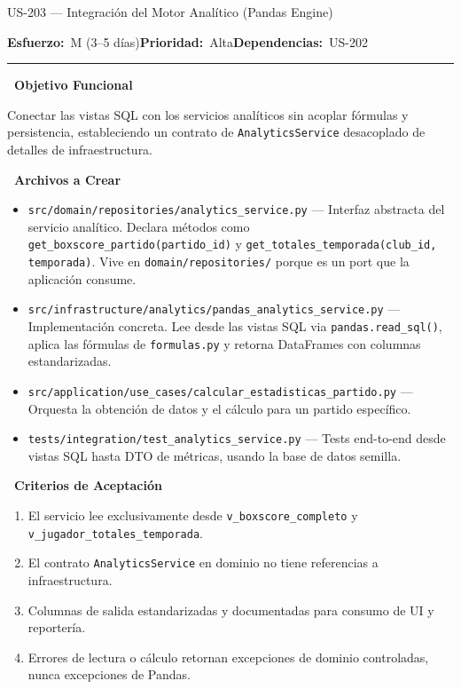 \documentclass[11pt,a4paper]{article}
\newcommand{\fpath}[1]{\texttt{\small #1}}
\newcommand{\usfield}[2][\;]{%
  \par\vspace{5pt}%
  {\small\textbf{\textcolor{primary}{#2}}}\par\vspace{2pt}%
}
\newcommand{\usmeta}[3]{%
  \vspace{2pt}%
  {\small\textcolor{secondary}{%
    \textbf{Esfuerzo:}~#1\quad\textbf{Prioridad:}~#2\quad\textbf{Dependencias:}~#3%
  }}%
  \par\vspace{4pt}%
  \textcolor{bordergray}{\rule{\linewidth}{0.4pt}}\par\vspace{4pt}%
}
\begin{document}
\begin{uscard}{US-203 — Integración del Motor Analítico (Pandas Engine)}

\usmeta{M (3–5 días)}{Alta}{US-202}

\usfield{\faAlignLeft\ Objetivo Funcional}
Conectar las vistas SQL con los servicios analíticos sin acoplar fórmulas y persistencia, estableciendo un contrato de \fpath{AnalyticsService} desacoplado de detalles de infraestructura.

\usfield{\faFolderOpen\ Archivos a Crear}
\begin{itemize}[nosep, leftmargin=1.6em]
  \item \fpath{src/domain/repositories/analytics\_service.py} — Interfaz abstracta del servicio analítico. Declara métodos como \fpath{get\_boxscore\_partido(partido\_id)} y \fpath{get\_totales\_temporada(club\_id, temporada)}. Vive en \fpath{domain/repositories/} porque es un port que la aplicación consume.
  \item \fpath{src/infrastructure/analytics/pandas\_analytics\_service.py} — Implementación concreta. Lee desde las vistas SQL via \fpath{pandas.read\_sql()}, aplica las fórmulas de \fpath{formulas.py} y retorna DataFrames con columnas estandarizadas.
  \item \fpath{src/application/use\_cases/calcular\_estadisticas\_partido.py} — Orquesta la obtención de datos y el cálculo para un partido específico.
  \item \fpath{tests/integration/test\_analytics\_service.py} — Tests end-to-end desde vistas SQL hasta DTO de métricas, usando la base de datos semilla.
\end{itemize}

\usfield{\faCheckCircle\ Criterios de Aceptación}
\begin{enumerate}[label=\textcolor{accent}{\textbf{AC\arabic*.}}, nosep, leftmargin=2.2em]
  \item El servicio lee exclusivamente desde \fpath{v\_boxscore\_completo} y \fpath{v\_jugador\_totales\_temporada}.
  \item El contrato \fpath{AnalyticsService} en dominio no tiene referencias a infraestructura.
  \item Columnas de salida estandarizadas y documentadas para consumo de UI y reportería.
  \item Errores de lectura o cálculo retornan excepciones de dominio controladas, nunca excepciones de Pandas.
\end{enumerate}


\end{uscard}
\end{document}
